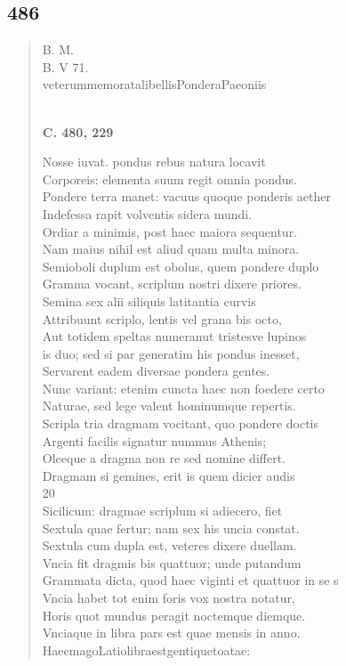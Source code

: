 \documentclass[11pt, a4paper]{report}
\begin{document}
            \subsection*{486}
      \begin{verse}
      B. M. \\ B. V 71. \\ veterummemoratalibellisPonderaPaeoniis \\ 
        ﻿\pagebreak 
     \marginpar{[30]} \begin{center} \textbf{C. 480, 229} \end{center}Nosse iuvat. pondus rebus natura locavit \\ Corporeis: elementa suum regit omnia pondus. \\ Pondere terra manet: vacuus quoque ponderis aether \\ Indefessa rapit volventis sidera mundi. \\ Ordiar a minimis, post haec maiora sequentur. \\ Nam maius nihil est aliud quam multa minora. \\ Semioboli duplum est obolus, quem pondere duplo \\ Gramma vocant, scriplum nostri dixere priores. \\ Semina sex alii siliquis latitantia curvis \\ Attribuunt scriplo, lentis vel grana bis octo, \\ Aut totidem speltas numeranut tristesve lupinos \\ is duo; sed si par generatim his pondus inesset, \\ Servarent eadem diversae pondera gentes. \\ Nunc variant: etenim cuncta haec non foedere certo \\ Naturae, sed lege valent hominumque repertis. \\ Scripla tria dragmam vocitant, quo pondere doctis \\ Argenti facilis signatur nummus Athenis; \\ Olceque a dragma non re sed nomine differt. \\ Dragmam si gemines, erit is quem dicier audis \\ 20 \\ Sicilicum: dragmae scriplum si adiecero, fiet \\ Sextula quae fertur; nam sex his uncia constat. \\ Sextula cum dupla est, veteres dixere duellam. \\ Vncia fit dragmis bis quattuor; unde putandum \\ Grammata dicta, quod haec viginti et quattuor in se s \\ Vncia habet tot enim foris vox nostra notatur, \\ Horis quot mundus peragit noctemque diemque. \\ Vnciaque in libra pars est quae mensis in anno. \\ HaecmagoLatiolibraestgentiquetoatae: \\ 

\end{verse}
\end{document}
